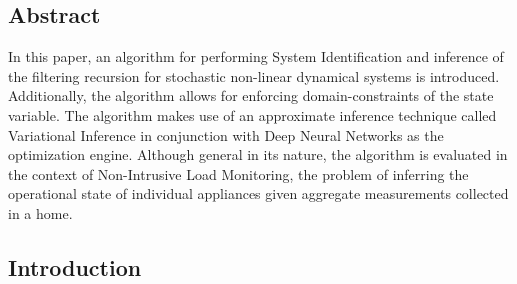 
\subsection{Abstract}

In this paper, an algorithm for performing System Identification and inference of the filtering recursion for stochastic non-linear dynamical systems is introduced. Additionally, the algorithm allows for enforcing domain-constraints of the state variable. The algorithm makes use of an approximate inference technique called Variational Inference in conjunction with Deep Neural Networks as the optimization engine. Although general in its nature, the algorithm is evaluated in the context of Non-Intrusive Load Monitoring, the problem of inferring the operational state of individual appliances given aggregate measurements collected in a home.


\subsection{Introduction}
\label{sec:intro}

